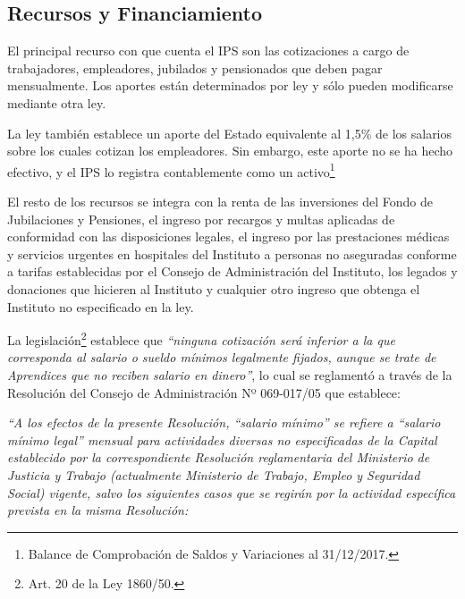 \subsection{Recursos y Financiamiento}

El principal recurso con que cuenta el IPS son las cotizaciones a cargo de trabajadores, empleadores, jubilados y pensionados que deben pagar mensualmente. Los aportes están determinados por ley y sólo pueden modificarse mediante otra ley. 

La ley también establece un aporte del Estado equivalente al 1,5\% de los salarios sobre los cuales cotizan los empleadores. Sin embargo, este aporte no se ha hecho efectivo, y el IPS lo registra contablemente como un activo\footnote{Balance de Comprobación de Saldos y Variaciones al 31/12/2017.} 

El resto de los recursos se integra con la renta de las inversiones del Fondo de Jubilaciones y Pensiones, el ingreso por recargos y multas aplicadas de conformidad con las disposiciones legales, el ingreso por las prestaciones médicas y servicios urgentes en hospitales del Instituto a personas no aseguradas conforme a tarifas establecidas por el Consejo de Administración del Instituto, los legados y donaciones que hicieren al Instituto y cualquier otro ingreso que obtenga el Instituto no especificado en la ley. 

La legislación\footnote{Art. 20 de la Ley 1860/50.} establece que \textit{“ninguna cotización será inferior a la que corresponda al salario o sueldo mínimos legalmente fijados, aunque se trate de Aprendices que no reciben salario en dinero”}, lo cual se reglamentó a través de la Resolución del Consejo de Administración Nº 069-017/05 que establece:

\textit{“A los efectos de la presente Resolución, “salario mínimo” se refiere a “salario mínimo legal” mensual para actividades diversas no especificadas de la Capital establecido por la correspondiente Resolución reglamentaria del Ministerio de Justicia y Trabajo (actualmente Ministerio de Trabajo, Empleo y Seguridad Social) vigente, salvo los siguientes casos que se regirán por la actividad específica prevista en la misma Resolución:}


